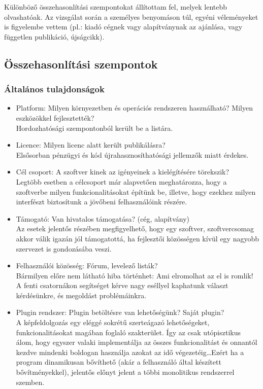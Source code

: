 \documentclass[a4paper,12pt,oneside]{report}
\begin{document}
Különböző összehasonlítási szempontokat állítottam fel, melyek lentebb olvashatóak. Az vizsgálat során a személyes benyomáson túl, egyéni véleményeket is figyelembe vettem (pl.: kiadó cégnek vagy alapítványnak az ajánlása, vagy független publikáció, újságcikk).
\subsection{Összehasonlítási szempontok}

\subsubsection{Általános tulajdonságok}
\begin{itemize}
	\itemsep0em
	\item Platform: Milyen környezetben és operációs rendszeren használható? Milyen eszközökkel fejlesztették? \\Hordozhatósági szempontonból került be a listára.
	\item Licence: Milyen licenc alatt került publikálásra?\\Elsősorban pénzügyi és kód újrahasznosíthatósági jellemzők miatt érdekes.
	\item Cél csoport: A szoftver kinek az igényeinek a kielégítésére törekszik?\\Legtöbb esetben a célcsoport már alapvetően meghatározza, hogy a szoftverbe milyen funkcionalitásokat építünk be, illetve, hogy ezekhez milyen interfészt biztosítunk a jövőbeni felhasználóink részére.
	\item Támogató: Van hivatalos támogatása? (cég, alapítvány)\\Az esetek jelentős részében megfigyelhető, hogy egy szoftver, szoftvercsomag akkor válik igazán jól támogatottá, ha fejlesztői közösségen kívül egy nagyobb szervezet is gondozásába veszi.
	\item Felhasználói közösség: Fórum, levelező listák?\\Bármilyen előre nem látható hiba történhet: Ami elromolhat az el is romlik! A fenti csatornákon segítséget kérve nagy eséllyel kaphatunk választ kérdésünkre, és megoldást problémáinkra.
	\item Plugin rendszer: Plugin betöltésre van lehetőségünk? Saját plugin?\\A képfeldolgozás egy eléggé sokrétű szerteágazó lehetőségeket, funkcionalitásokat magában foglaló szakterület. Így az csak utópisztikus álom, hogy egyszer valaki implementálja az összes funkcionalitást és onnantól kezdve mindenki boldogan használja azokat az idő végezetéig\dots Ezért ha a program dinamikusan bővíthető (akár a felhasználó által készített bővítményekkel), jelentős előnyt jelent a többi monolitikus rendszerrel szemben.

\end{itemize}
\end{document}
